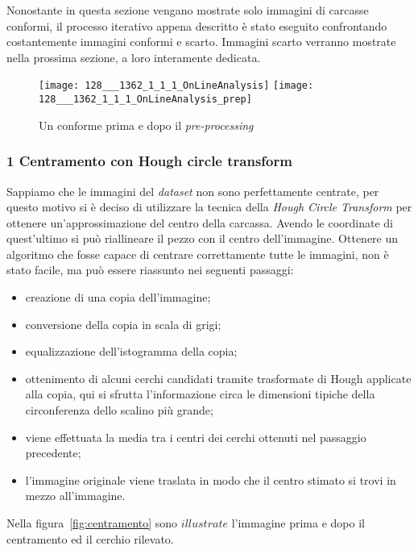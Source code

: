 Nonostante in questa sezione vengano mostrate solo immagini di carcasse conformi, il processo iterativo appena descritto è stato eseguito confrontando costantemente immagini conformi e scarto.
Immagini scarto verranno mostrate nella prossima sezione, a loro interamente dedicata.

\begin{figure}[ht] %
  \begin{center}
    \texttt{[image: 128\_\_\_1362\_1\_1\_1\_OnLineAnalysis]}
    \texttt{[image: 128\_\_\_1362\_1\_1\_1\_OnLineAnalysis\_prep]}
    \caption{Un conforme prima e dopo il \textit{pre-processing}}
    \label{fig:prima_dopo_prep}
  \end{center}
\end{figure}

\subsubsection{1 Centramento con Hough circle transform}
Sappiamo che le immagini del \textit{dataset} non sono perfettamente centrate, per questo motivo si è deciso di utilizzare la tecnica della \textit{Hough Circle Transform} per ottenere un'approssimazione del centro della carcassa.
Avendo le coordinate di quest'ultimo si può riallineare il pezzo con il centro dell'immagine.
Ottenere un algoritmo che fosse capace di centrare correttamente tutte le immagini, non è stato facile, ma può essere riassunto nei seguenti passaggi:
\begin{itemize}
  \item creazione di una copia dell'immagine;
  \item conversione della copia in scala di grigi;
  \item equalizzazione dell'istogramma della copia;
  \item ottenimento di alcuni cerchi candidati tramite trasformate di Hough applicate alla copia, qui si sfrutta l'informazione circa le dimensioni tipiche della circonferenza dello scalino più grande;
  \item viene effettuata la media tra i centri dei cerchi ottenuti nel passaggio precedente;
  \item l'immagine originale viene traslata in modo che il centro stimato si trovi in mezzo all'immagine.
\end{itemize}

Nella figura~\ref{fig:centramento} sono $illustrate$ l'immagine prima e dopo il centramento ed il cerchio rilevato.

